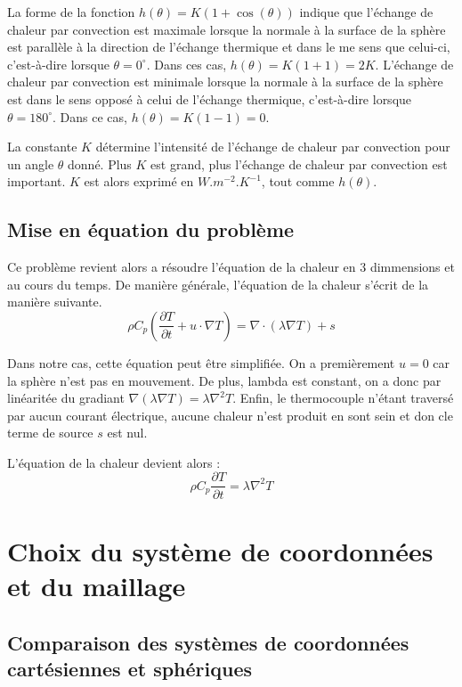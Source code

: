 \documentclass[fleqn]{article}
\begin{document}
La forme de la fonction $h(\theta) = K (1 + \cos(\theta))$ indique que l'échange de chaleur par convection est maximale lorsque la normale à la surface de la sphère est parallèle à la direction de l'échange thermique et dans le me sens que celui-ci, c'est-à-dire lorsque $\theta = 0^\circ$. Dans ces cas, $h(\theta) = K (1 + 1) = 2K$. L'échange de chaleur par convection est minimale lorsque la normale à la surface de la sphère est dans le sens opposé à celui de l'échange thermique, c'est-à-dire lorsque $\theta = 180^\circ$. Dans ce cas, $h(\theta) = K (1 - 1) = 0$.

La constante $K$ détermine l'intensité de l'échange de chaleur par convection pour un angle $\theta$ donné. Plus $K$ est grand, plus l'échange de chaleur par convection est important. $K$ est alors exprimé en $W.m^{-2}.K^{-1}$, tout comme $h(\theta)$.

\subsection{Mise en équation du problème}
Ce problème revient alors a résoudre l'équation de la chaleur en 3 dimmensions et au cours du temps.
De manière générale, l'équation de la chaleur s'écrit de la manière suivante.
\begin{equation}
    \rho C_p \left(  \frac{ \partial T}{\partial t} + u \cdot \nabla T \right) = \nabla \cdot ( \lambda  \nabla T) + s
\end{equation}

Dans notre cas, cette équation peut être simplifiée. On a premièrement $u = 0$ car la sphère n'est pas en mouvement. De plus, lambda est constant, on a donc par linéaritée du gradiant $\nabla ( \lambda \nabla T ) = \lambda \nabla^2 T$. Enfin, le thermocouple n'étant traversé par aucun courant électrique, aucune chaleur n'est produit en sont sein et don cle terme de source $s$ est nul.

L'équation de la chaleur devient alors :
\begin{equation}
    \rho C_p   \frac{ \partial T}{\partial t} = \lambda\nabla^2 T
    \label{equation de la chaleur}
\end{equation}


\section{Choix du système de coordonnées et du maillage}
\subsection{Comparaison des systèmes de coordonnées cartésiennes et sphériques}
\end{document}
